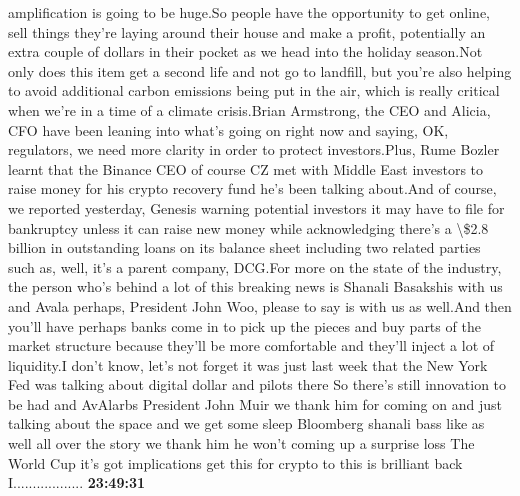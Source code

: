 \documentclass{article}%
\begin{document}
amplification is going to be huge.So people have the opportunity to get online, sell things they're laying around their house and make a profit, potentially an extra couple of dollars in their pocket as we head into the holiday season.Not only does this item get a second life and not go to landfill, but you're also helping to avoid additional carbon emissions being put in the air, which is really critical when we're in a time of a climate crisis.Brian Armstrong, the CEO and Alicia, CFO have been leaning into what's going on right now and saying, OK, regulators, we need more clarity in order to protect investors.Plus, Rume Bozler learnt that the Binance CEO of course CZ met with Middle East investors to raise money for his crypto recovery fund he's been talking about.And of course, we reported yesterday, Genesis warning potential investors it may have to file for bankruptcy unless it can raise new money while acknowledging there's a \textbackslash{}\$2.8 billion in outstanding loans on its balance sheet including two related parties such as, well, it's a parent company, DCG.For more on the state of the industry, the person who's behind a lot of this breaking news is Shanali Basakshis with us and Avala perhaps, President John Woo, please to say is with us as well.And then you'll have perhaps banks come in to pick up the pieces and buy parts of the market structure because they'll be more comfortable and they'll inject a lot of liquidity.I don't know, let's not forget it was just last week that the New York Fed was talking about digital dollar and pilots there So there's still innovation to be had and AvAlarbs President John Muir we thank him for coming on and just talking about the space and we get some sleep Bloomberg shanali bass like as well all over the story we thank him he won't coming up a surprise loss The World Cup it's got implications get this for crypto to this is brilliant back I..................%
\textbf{23:49:31}%
\newline%
\end{document}

